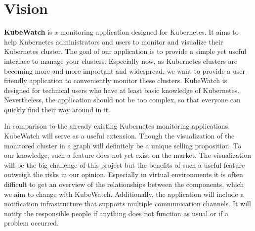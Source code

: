\chapter{Vision}


\textbf{KubeWatch} is a monitoring application designed for Kubernetes.
It aims to help Kubernetes administrators and users to monitor and visualize their Kubernetes cluster.
The goal of our application is to provide a simple yet useful interface to manage your clusters.
Especially now, as Kubernetes clusters are becoming more and more important and widespread,
we want to provide a user-friendly application to conveniently monitor these clusters.
KubeWatch is designed for technical users who have at least basic knowledge of Kubernetes.
Nevertheless, the application should not be too complex, so that everyone can quickly find their way around in it.

\noindent
In comparison to the already existing Kubernetes monitoring applications, KubeWatch will serve as a useful extension.
Though the visualization of the monitored cluster in a graph will definitely be a unique selling proposition.
To our knowledge, such a feature does not yet exist on the market.
The visualization will be the big challenge of this project but the benefits of such a useful feature outweigh the risks in our opinion.
Especially in virtual environments it is often difficult to get an overview of the relationships between the components,
which we aim to change with KubeWatch.
Additionally, the application will include a notification infrastructure that supports multiple communication channels.
It will notify the responsible people if anything does not function as usual or if a problem occurred.
